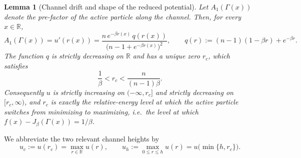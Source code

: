\documentclass{article} %
\theoremstyle{plain}
\newtheorem{lemma}[theorem]{Lemma}
\theoremstyle{definition}
\theoremstyle{remark}
\newcommand{\prefactor}[2]{A_{#1}(#2)}
\newcommand{\R}{\mathbb{R}}
\begin{document}
\begin{lemma}[Channel drift and shape of the reduced potential]
\label{lem:channel-drift}
Let $\prefactor{1}{\Gamma(x)}$ denote the pre-factor of the active particle along the channel. Then, for every $x\in\R$,
\begin{equation}
    \prefactor{1}{\Gamma(x)}=u'(r(x))
    =\frac{n\,e^{-\beta r(x)}\,q(r(x))}{\bigl(n-1+e^{-\beta r(x)}\bigr)^{2}},
    \qquad
    q(r):=(n-1)(1-\beta r)+e^{-\beta r}.
    \label{eq:a1-equals-uprime}
\end{equation}
The function $q$ is strictly decreasing on $\R$ and has a unique zero $r_c$, which satisfies
\begin{equation}
    \frac1\beta<r_c<\frac{n}{(n-1)\beta}.
    \label{eq:rc-location}
\end{equation}
Consequently $u$ is strictly increasing on $(-\infty,r_c]$ and strictly decreasing on $[r_c,\infty)$, and $r_c$ is exactly the relative-energy level at which the active particle switches from minimizing to maximizing, i.e.\ the level at which $f(x)-J_\beta(\Gamma(x))=1/\beta$.
\end{lemma}

We abbreviate the two relevant channel heights by
\begin{equation}
    u_c:=u(r_c)=\max_{r\in\R}u(r),
    \qquad
    u_h:=\max_{0\le r\le h}u(r)=u\bigl(\min\{h,r_c\}\bigr).
    \label{eq:channel-heights}
\end{equation}
\end{document}
